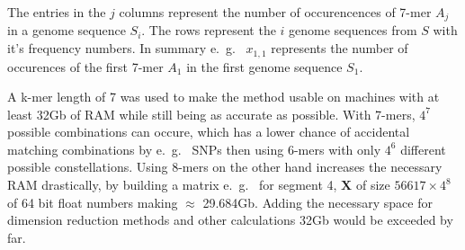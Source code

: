 The entries in the $j$ columns represent the number of occurencences of 7-mer $A_j$ in a genome sequence $S_i$. The rows represent the $i$ genome sequences from $S$ with it's frequency numbers. In summary e.~g.~ $x_{1,1}$ represents the number of occurences of the first 7-mer $A_1$ in the first genome sequence $S_1$.

A k-mer length of 7 was used to make the method usable on machines with at least 32Gb of RAM while still being as accurate as possible. With 7-mers, $4^7$ possible combinations can occure, which has a lower chance of accidental matching combinations by e.~g.~ \glspl{SNP} then using 6-mers with only $4^6$ different possible constellations. Using 8-mers on the other hand increases the necessary RAM drastically, by building a matrix e.~g.~ for segment 4, $\mathbf{X}$ of size $56617 \times 4^8$ of 64 bit float numbers making $\approx$ 29.684Gb. Adding the necessary space for dimension reduction methods and other calculations 32Gb would be exceeded by far. 